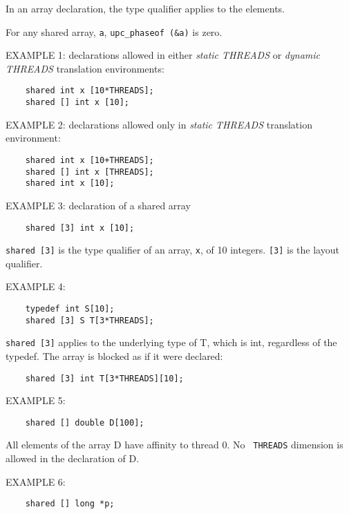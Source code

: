 \np In an array declaration, the type qualifier applies to
    the elements.

\np For any shared array, {\tt a}, {\tt upc\_phaseof (\&a)} is
    zero.

\np EXAMPLE 1: declarations allowed in either {\em static THREADS} or
    {\em dynamic THREADS} translation environments:

\begin{verbatim}
    shared int x [10*THREADS];  
    shared [] int x [10]; 
\end{verbatim}

\np EXAMPLE 2: declarations allowed only in {\em static THREADS} translation
    environment:

\begin{verbatim}
    shared int x [10+THREADS];  
    shared [] int x [THREADS];  
    shared int x [10]; 
\end{verbatim}

\np EXAMPLE 3: declaration of a shared array 

\begin{verbatim}
    shared [3] int x [10];
\end{verbatim}

   {\tt shared [3]} is the type qualifier of an array, {\tt x}, of 10
   integers. {\tt [3]} is the layout qualifier.

\np EXAMPLE 4: 

\begin{verbatim}
    typedef int S[10]; 
    shared [3] S T[3*THREADS]; 
\end{verbatim}
   

   {\tt shared [3]} applies to the underlying type of T, which is int,
   regardless of the typedef.  The array is blocked as if it were
   declared:

\begin{verbatim}
    shared [3] int T[3*THREADS][10]; 
\end{verbatim}

\np EXAMPLE 5: 

\begin{verbatim}
    shared [] double D[100]; 
\end{verbatim}
    

   All elements of the array D have affinity to thread 0.  No {\tt
   THREADS} dimension is allowed in the declaration of D.

\np EXAMPLE 6: 

\begin{verbatim}
    shared [] long *p;
\end{verbatim}
    

